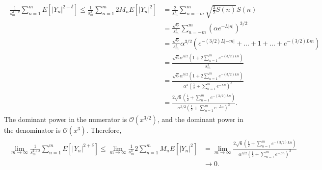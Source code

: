 \begin{align*}
\begin{split}
\frac{1}{s_m^{2+\delta}}\sum_{n=1}^mE[|Y_n|^{2+\delta}] \leq
\frac{1}{s_m^{3}}\sum_{n=1}^m2M_nE[|Y_n|^{2}]
&=\frac{2}{s_m^{3}}\sum_{n=-m}^m\sqrt{\frac{3}{2}S(n)}S(n)\\
&=\frac{\sqrt{6}}{s_m^{3}}\sum_{n=-m}^m(\alpha e^{-L|n|})^{3/2}\\
&=\frac{\sqrt{6}}{s_m^{3}}\alpha^{3/2}\left(e^{-(3/2)L|-m|}+...+1+...+e^{-(3/2)Lm}
\right)\\
&=\frac{\sqrt{6}\alpha^{3/2}\left(1+2\sum_{n=1}^{m}e^{-(3/2)Ln}\right)}{s_m^{3}}\\
&=\frac{\sqrt{6}\alpha^{3/2}\left(1+2\sum_{n=1}^{m}e^{-(3/2)Ln}\right)}{\alpha^3(\frac{1}{2} +\sum_{n=1}^m e^{-Ln})^3}\\
&=\frac{2\sqrt{6}\left(\frac{1}{2}+\sum_{n=1}^{m}e^{-(3/2)Ln}\right)}{\alpha^{3/2}(\frac{1}{2} +\sum_{n=1}^m e^{-Ln})^3}.
\end{split}
\end{align*}
The dominant power in the numerator is $\mathcal{O}(x^{3/2})$, and the
dominant power in the denominator is $\mathcal{O}(x^3)$. Therefore, 
\begin{align*}
\begin{split}
\lim_{m\to
  \infty}\frac{1}{s_m^{2+\delta}}\sum_{n=1}^mE[|Y_n|^{2+\delta}] \leq \lim_{m\to
  \infty}\frac{1}{s_m^{3}}2\sum_{n=1}^mM_nE[|Y_n|^2] &= \lim_{m\to \infty}\frac{2\sqrt{6}\left(\frac{1}{2}+\sum_{n=1}^{m}e^{-(3/2)Ln}\right)}{\alpha^{3/2}(\frac{1}{2} +\sum_{n=1}^m e^{-Ln})^3}\\
&\to 0.
\end{split}
\end{align*}

